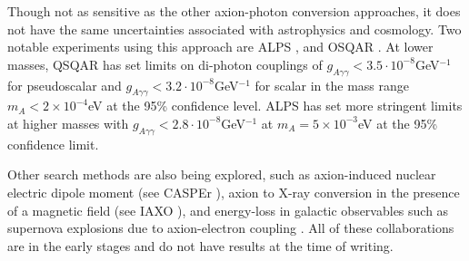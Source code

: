 Though not as sensitive as the other axion-photon conversion approaches, it does not have the same uncertainties associated with astrophysics and cosmology.
Two notable experiments using this approach are ALPS \cite{alps_axion_result_ref}, and OSQAR \cite{osqar_axion_result_ref}.
At lower masses, QSQAR has set limits on di-photon couplings of $g_{A \gamma \gamma}<3.5\cdot10^{-8}$GeV$^{-1}$ for pseudoscalar and $g_{A \gamma \gamma}<3.2\cdot10^{-8}$GeV$^{-1}$ for scalar in the mass range $m_A < 2 \times 10^{-4}$eV at the 95\% confidence level.
ALPS has set more stringent limits at higher masses with $g_{A \gamma \gamma}<2.8\cdot10^{-8}$GeV$^{-1}$ at $m_A = 5 \times 10^{-3}$eV at the 95\% confidence limit.

\par
Other search methods are also being explored, such as axion-induced nuclear electric dipole moment (see CASPEr \cite{casper_experiment_ref}), axion to X-ray conversion in the presence of a magnetic field (see IAXO \cite{iaxo_experiment_ref}), and energy-loss in galactic observables such as supernova explosions due to axion-electron coupling \cite{axions_from_supernova_ref}.
All of these collaborations are in the early stages and do not have results at the time of writing.

